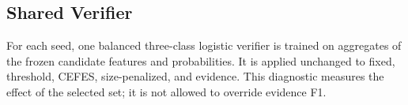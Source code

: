 \subsection{Shared Verifier}

For each seed, one balanced three-class logistic verifier is trained on aggregates of the frozen candidate features and probabilities. It is applied unchanged to fixed, threshold, CEFES, size-penalized, and \method{} evidence. This diagnostic measures the effect of the selected set; it is not allowed to override evidence F1.
